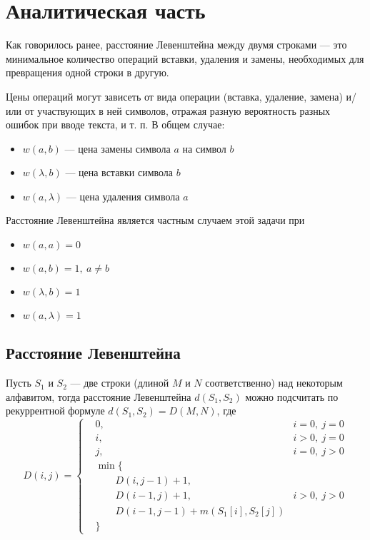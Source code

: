 \chapter{Аналитическая часть}

Как говорилось ранее, расстояние Левенштейна между двумя строками — это минимальное количество операций вставки, удаления и замены, необходимых для превращения одной строки в другую.

Цены операций могут зависеть от вида операции (вставка, удаление, замена) и/или от участвующих в ней символов, отражая разную вероятность разных ошибок при вводе текста, и т. п. В общем случае:
\begin{itemize}
	\item $w(a,b)$ — цена замены символа $a$ на символ $b$
	\item $w(\lambda,b)$ — цена вставки символа $b$
	\item $w(a,\lambda)$ — цена удаления символа $a$
\end{itemize}
Расстояние Левенштейна является частным случаем этой задачи \cite{ifmo} при
\begin{itemize}
	\item $w(a,a)=0$
	\item $w(a,b)=1, \medspace a \neq b$
	\item $w(\lambda,b)=1$
	\item $w(a,\lambda)=1$
\end{itemize}

\section{Расстояние Левенштейна}

Пусть $S_{1}$ и $S_{2}$ — две строки (длиной $M$ и $N$ соответственно) над некоторым алфавитом, тогда расстояние Левенштейна $d(S_{1},S_{2})$ можно подсчитать по рекуррентной формуле $d(S_{1},S_{2}) = D(M,N)$, где\\
\[ 
D(i,j) = 
\left \{ \begin{aligned}
& 0, & i = 0, \medspace j = 0\\
& i, & i > 0, \medspace j = 0\\
& j, & i = 0, \medspace j > 0\\
& \min\{ &\\
& \qquad D(i, j - 1) + 1, & \\
& \qquad D(i - 1, j) + 1, & i > 0, \medspace j > 0\\
& \qquad D(i - 1, j - 1) + m(S_{1}[i], S_{2}[j]) &\\
& \} &
\end{aligned} \right. 
\]

